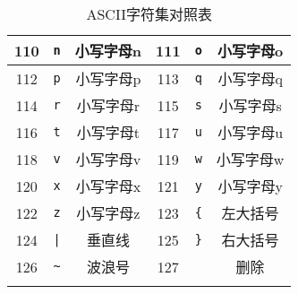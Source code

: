 \begin{longtable}{|c|c|c|c|c|c|}
            \hline \rule{0pt}{15pt}
            110  & 	\texttt{n}         & 小写字母n       	& 111  & 	\texttt{o}         & 小写字母o       	\\
            \hline \rule{0pt}{15pt}
            112  & 	\texttt{p}         & 小写字母p       	& 113  & 	\texttt{q}         & 小写字母q       	\\
            \hline \rule{0pt}{15pt}
            114  & 	\texttt{r}         & 小写字母r       	& 115  & 	\texttt{s}         & 小写字母s       	\\
            \hline \rule{0pt}{15pt}
            116  & 	\texttt{t}         & 小写字母t       	& 117  & 	\texttt{u}         & 小写字母u       	\\
            \hline \rule{0pt}{15pt}
            118  & 	\texttt{v}         & 小写字母v       	& 119  & 	\texttt{w}         & 小写字母w       	\\
            \hline \rule{0pt}{15pt}
            120  & 	\texttt{x}         & 小写字母x       	& 121  & 	\texttt{y}         & 小写字母y       	\\
            \hline \rule{0pt}{15pt}
            122  & 	\texttt{z}         & 小写字母z       	& 123  & \texttt{\{}         & 左大括号        	\\
            \hline \rule{0pt}{15pt}
            124  & \texttt{|}         & 垂直线           	& 125  & \texttt{\}}         & 右大括号        	\\
            \hline \rule{0pt}{15pt}
            126  & \texttt{\~{}}         & 波浪号           	& 127  &           & 删除           	\\
            \hline
            \caption{ASCII字符集对照表} \label{ASCII字符集对照表}
        \end{longtable}

